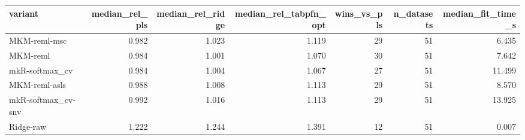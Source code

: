 \begin{tabular}{lrrrrrr}
\toprule
variant & median_rel_pls & median_rel_ridge & median_rel_tabpfn_opt & wins_vs_pls & n_datasets & median_fit_time_s \\
\midrule
MKM-reml-msc & 0.982 & 1.023 & 1.119 & 29 & 51 & 6.435 \\
MKM-reml & 0.984 & 1.001 & 1.070 & 30 & 51 & 7.642 \\
mkR-softmax_cv & 0.984 & 1.004 & 1.067 & 27 & 51 & 11.499 \\
MKM-reml-asls & 0.988 & 1.008 & 1.113 & 29 & 51 & 8.570 \\
mkR-softmax_cv-snv & 0.992 & 1.016 & 1.113 & 29 & 51 & 13.925 \\
Ridge-raw & 1.222 & 1.244 & 1.391 & 12 & 51 & 0.007 \\
\bottomrule
\end{tabular}
